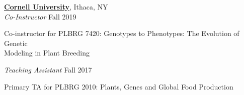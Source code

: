 \documentclass[10pt]{article}
\begin{document}
\href{https://www.cornell.edu/}{\textbf{Cornell University}},
Ithaca, NY\\
\textit{Co-Instructor}%
    \hfill Fall 2019\\
    \vspace{-1\baselineskip}
    \begin{innerlist}
        \item Co-instructor for PLBRG 7420: Genotypes to Phenotypes: The Evolution of Genetic \\ Modeling in Plant Breeding
    \end{innerlist}

\textit{Teaching Assistant}%
    \hfill Fall 2017\\
    \vspace{-1\baselineskip}
    \begin{innerlist}
        \item Primary TA for PLBRG 2010: Plants, Genes and Global Food Production
    \end{innerlist}
\end{document}
